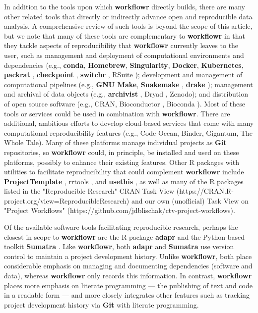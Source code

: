 \documentclass[9pt,a4paper]{extarticle}
\begin{document}
In addition to the tools upon which \textbf{workflowr} directly builds, there are
many other related tools that directly or indirectly advance open and
reproducible data analysis. A comprehensive review of such tools is
beyond the scope of this article, but we note that many of these tools
are complementary to \textbf{workflowr} in that they tackle aspects of
reproducibility that \textbf{workflowr} currently leaves to the user, such as
management and deployment of computational environments and dependencies
(e.g., \textbf{conda}, \textbf{Homebrew}, \textbf{Singularity}, \textbf{Docker}, \textbf{Kubernetes}, \textbf{packrat}
\cite{packrat}, \textbf{checkpoint} \cite{checkpoint}, \textbf{switchr} \cite{switchr},
RSuite \cite{RSuite}); development and management of computational
pipelines (e.g., \textbf{GNU Make}, \textbf{Snakemake} \cite{snakemake}, \textbf{drake}
\cite{drake}); management and archival of data objects (e.g., \textbf{archivist}
\cite{archivist}, Dryad \cite{dryad}, Zenodo); and distribution of open
source software (e.g., CRAN, Bioconductor \cite{bioconductor}, Bioconda
\cite{bioconda}). Most of these tools or services could be used in
combination with \textbf{workflowr}. There are additional, ambitious efforts to
develop cloud-based services that come with many computational
reproducibility features (e.g., Code Ocean, Binder, Gigantum, The Whole
Tale). Many of these platforms manage individual projects as \textbf{Git}
repositories, so \textbf{workflowr} could, in principle, be installed and used on
these platforms, possibly to enhance their existing features. Other R
packages with utilities to facilitate reproducibility that could
complement \textbf{workflowr} include \textbf{ProjectTemplate} \cite{projecttemplate},
rrtools \cite{rrtools}, and \textbf{usethis} \cite{usethis}, as well as many of
the R packages listed in the "Reproducible Research" CRAN Task View
(https://CRAN.R-project.org/view=ReproducibleResearch) and our own
(unofficial) Task View on "Project Workflows"
(https://github.com/jdblischak/ctv-project-workflows).

Of the available software tools facilitating reproducible research,
perhaps the closest in scope to \textbf{workflowr} are the R package \textbf{adapr}
\cite{Gelfond2018} and the Python-based toolkit \textbf{Sumatra}
\cite{Davidson2014}. Like \textbf{workflowr}, both \textbf{adapr} and \textbf{Sumatra} use version
control to maintain a project development history. Unlike \textbf{workflowr},
both place considerable emphasis on managing and documenting
dependencies (software and data), whereas \textbf{workflowr} only records this
information. In contrast, \textbf{workflowr} places more emphasis on literate
programming --- the publishing of text and code in a readable form ---
and more closely integrates other features such as tracking project
development history via \textbf{Git} with literate programming.
\end{document}
